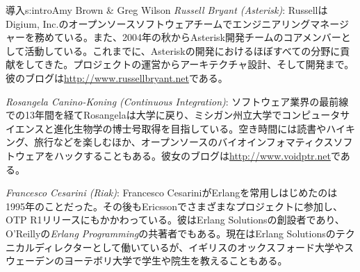 \begin{aosachapter}{導入}{s:intro}{Amy Brown \& Greg Wilson}
\emph{Russell Bryant (Asterisk)}: RussellはDigium, Inc.のオープンソースソフトウェアチームでエンジニアリングマネージャーを務めている。また、2004年の秋からAsterisk開発チームのコアメンバーとして活動している。これまでに、Asteriskの開発におけるほぼすべての分野に貢献をしてきた。プロジェクトの運営からアーキテクチャ設計、そして開発まで。彼のブログは\url{http://www.russellbryant.net}である。

\emph{Rosangela Canino-Koning (Continuous Integration)}: ソフトウェア業界の最前線での13年間を経てRosangelaは大学に戻り、ミシガン州立大学でコンピュータサイエンスと進化生物学の博士号取得を目指している。空き時間には読書やハイキング、旅行などを楽しむほか、オープンソースのバイオインフォマティクスソフトウェアをハックすることもある。彼女のブログは\url{http://www.voidptr.net}である。

\emph{Francesco Cesarini (Riak)}: Francesco CesariniがErlangを常用しはじめたのは1995年のことだった。その後もEricssonでさまざまなプロジェクトに参加し、OTP R1リリースにもかかわっている。彼はErlang Solutionsの創設者であり、O'Reillyの\emph{Erlang Programming}の共著者でもある。現在はErlang Solutionsのテクニカルディレクターとして働いているが、イギリスのオックスフォード大学やスウェーデンのヨーテボリ大学で学生や院生を教えることもある。


\end{aosachapter}
